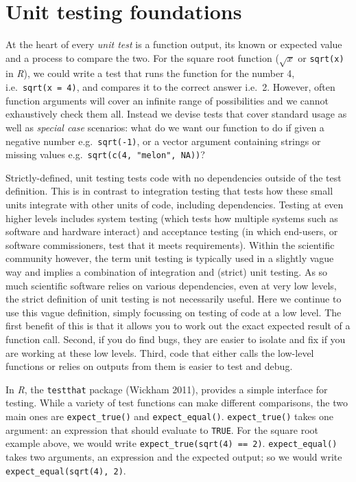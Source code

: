 \documentclass[
]{article}
\begin{document}
\hypertarget{unit-testing-foundations}{%
\section{Unit testing foundations}\label{unit-testing-foundations}}

At the heart of every \emph{unit test} is a function output, its known or expected value and a process to compare the two.
For the square root function (\(\sqrt{x}\) or \texttt{sqrt(x)} in \emph{R}), we could write a test that runs the function for the number 4, i.e.~\texttt{sqrt(x\ =\ 4)}, and compares it to the correct answer i.e.~2.
However, often function arguments will cover an infinite range of possibilities and we cannot exhaustively check them all.
Instead we devise tests that cover standard usage as well as \emph{special case} scenarios: what do we want our function to do if given a negative number e.g.~\texttt{sqrt(-1)}, or a vector argument containing strings or missing values e.g.~\texttt{sqrt(c(4,\ "melon",\ NA))}?

Strictly-defined, unit testing tests code with no dependencies outside of the test definition.
This is in contrast to integration testing that tests how these small units integrate with other units of code, including dependencies.
Testing at even higher levels includes system testing (which tests how multiple systems such as software and hardware interact) and acceptance testing (in which end-users, or software commissioners, test that it meets requirements).
Within the scientific community however, the term unit testing is typically used in a slightly vague way and implies a combination of integration and (strict) unit testing.
As so much scientific software relies on various dependencies, even at very low levels, the strict definition of unit testing is not necessarily useful.
Here we continue to use this vague definition, simply focussing on testing of code at a low level.
The first benefit of this is that it allows you to work out the exact expected result of a function call.
Second, if you do find bugs, they are easier to isolate and fix if you are working at these low levels.
Third, code that either calls the low-level functions or relies on outputs from them is easier to test and debug.

In \emph{R}, the \texttt{testthat} package (Wickham 2011), provides a simple interface for testing.
While a variety of test functions can make different comparisons, the two main ones are \texttt{expect\_true()} and \texttt{expect\_equal()}.
\texttt{expect\_true()} takes one argument: an expression that should evaluate to \texttt{TRUE}.
For the square root example above, we would write \texttt{expect\_true(sqrt(4)\ ==\ 2)}.
\texttt{expect\_equal()} takes two arguments, an expression and the expected output;
so we would write \texttt{expect\_equal(sqrt(4),\ 2)}.
\end{document}
